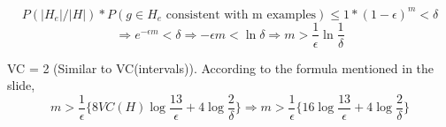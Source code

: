 \begin{equation*}
	P(|H_e|/|H|) * P(g \in H_e\mbox{ consistent with m examples}) \le 1 * (1 - \epsilon)^m <  \delta
\end{equation*}
\begin{equation*}
	\Rightarrow  e^{-\epsilon m} < \delta
	\Rightarrow - \epsilon m < \ln \delta 
	\Rightarrow m > \frac{1}{\epsilon}  \ln \frac{1}{\delta}
\end{equation*}
\item[(d)]
VC = 2 (Similar to VC(intervals)). According to the formula mentioned in the slide, 
\begin{equation*}
	 m > \frac{1}{\epsilon}\{ 8VC(H) \log \frac{13}{\epsilon} + 4\log \frac{2}{\delta} \}  
	\Rightarrow m > \frac{1}{\epsilon}\{ 16 \log \frac{13}{\epsilon} + 4\log \frac{2}{\delta} \} 
\end{equation*}



